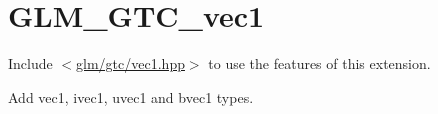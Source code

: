 \hypertarget{group__gtc__vec1}{}\section{G\+L\+M\+\_\+\+G\+T\+C\+\_\+vec1}
\label{group__gtc__vec1}
Include $<$\mbox{\hyperlink{gtc_2vec1_8hpp}{glm/gtc/vec1.\+hpp}}$>$ to use the features of this extension.

Add vec1, ivec1, uvec1 and bvec1 types. 